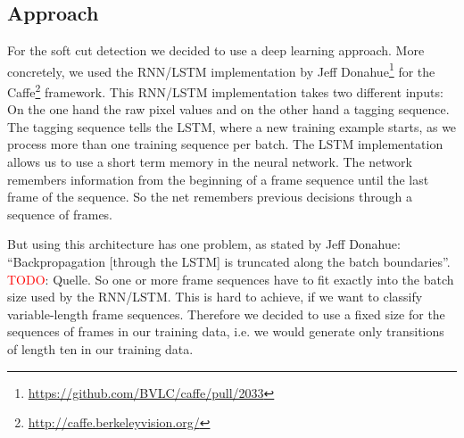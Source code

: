 \subsection{Approach}
\label{sec:soft_cut_approach}

For the soft cut detection we decided to use a deep learning approach.
More concretely, we used the RNN/LSTM implementation by Jeff Donahue\footnote{\url{https://github.com/BVLC/caffe/pull/2033}} for the Caffe\footnote{\url{http://caffe.berkeleyvision.org/}} framework.
This RNN/LSTM implementation takes two different inputs: On the one hand the raw pixel values and on the other hand a tagging sequence.
The tagging sequence tells the LSTM, where a new training example starts, as we process more than one training sequence per batch.
The LSTM implementation allows us to use a short term memory in the neural network.
The network remembers information from the beginning of a frame sequence until the last frame of the sequence.
So the net remembers previous decisions through a sequence of frames.

But using this architecture has one problem, as stated by Jeff Donahue: ``Backpropagation [through the LSTM] is truncated along the batch boundaries''. \textcolor{red}{TODO}: Quelle.
So one or more frame sequences have to fit exactly into the batch size used by the RNN/LSTM.
This is hard to achieve, if we want to classify variable-length frame sequences.
Therefore we decided to use a fixed size for the sequences of frames in our training data, i.e. we would generate only transitions of length ten in our training data.

